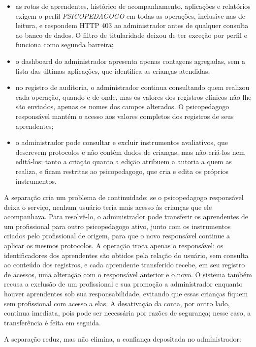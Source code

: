 \begin{itemize}
    \item as rotas de aprendentes, histórico de acompanhamento, aplicações e relatórios exigem o perfil \textit{PSICOPEDAGOGO} em todas as operações, inclusive nas de leitura, e respondem HTTP 403 ao administrador antes de qualquer consulta ao banco de dados. O filtro de titularidade deixou de ter exceção por perfil e funciona como segunda barreira;
    \item o dashboard do administrador apresenta apenas contagens agregadas, sem a lista das últimas aplicações, que identifica as crianças atendidas;
    \item no registro de auditoria, o administrador continua consultando quem realizou cada operação, quando e de onde, mas os valores dos registros clínicos não lhe são enviados, apenas os nomes dos campos alterados. O psicopedagogo responsável mantém o acesso aos valores completos dos registros de seus aprendentes;
    \item o administrador pode consultar e excluir instrumentos avaliativos, que descrevem protocolos e não contêm dados de crianças, mas não criá-los nem editá-los: tanto a criação quanto a edição atribuem a autoria a quem as realiza, e ficam restritas ao psicopedagogo, que cria e edita os próprios instrumentos.
\end{itemize}

A separação cria um problema de continuidade: se o psicopedagogo responsável deixa o serviço, nenhum usuário teria mais acesso às crianças que ele acompanhava. Para resolvê-lo, o administrador pode transferir os aprendentes de um profissional para outro psicopedagogo ativo, junto com os instrumentos criados pelo profissional de origem, para que o novo responsável continue a aplicar os mesmos protocolos. A operação troca apenas o responsável: os identificadores dos aprendentes são obtidos pela relação do usuário, sem consulta ao conteúdo dos registros, e cada aprendente transferido recebe, em seu registro de acessos, uma alteração com o responsável anterior e o novo. O sistema também recusa a exclusão de um profissional e sua promoção a administrador enquanto houver aprendentes sob sua responsabilidade, evitando que essas crianças fiquem sem profissional com acesso a elas. A desativação da conta, por outro lado, continua imediata, pois pode ser necessária por razões de segurança; nesse caso, a transferência é feita em seguida.

A separação reduz, mas não elimina, a confiança depositada no administrador:

